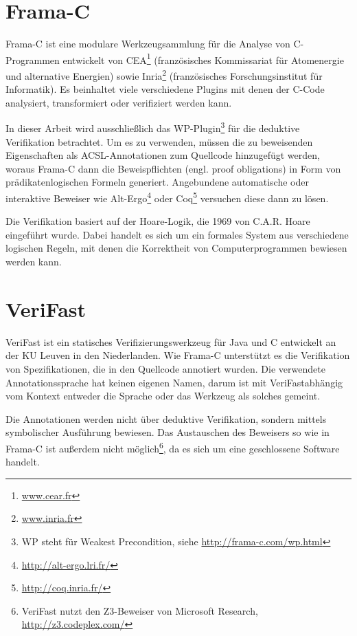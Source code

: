 \section{Frama-C}
\label{acsl-und-frama-c}

Frama-C ist eine modulare Werkzeugsammlung für die Analyse von C-Programmen entwickelt von CEA\footnote{\url{www.cear.fr}}
(französisches Kommissariat für Atomenergie und alternative Energien) sowie Inria\footnote{\url{www.inria.fr}} 
(französisches Forschungsinstitut für Informatik). Es beinhaltet viele verschiedene Plugins mit denen der C-Code
analysiert, transformiert oder verifiziert werden kann. 

In dieser Arbeit wird ausschließlich das WP-Plugin\footnote{WP steht für Weakest Precondition, siehe
\url{http://frama-c.com/wp.html}} für die deduktive Verifikation betrachtet. Um es zu verwenden, müssen die zu beweisenden 
Eigenschaften als ACSL-Annotationen zum Quellcode hinzugefügt werden, woraus Frama-C dann die 
Beweispflichten (engl. proof obligations) in Form von prädikatenlogischen Formeln generiert. Angebundene automatische oder 
interaktive Beweiser wie Alt-Ergo\footnote{\url{http://alt-ergo.lri.fr/}} oder Coq\footnote{\url{http://coq.inria.fr/}}
versuchen diese dann zu lösen.

Die Verifikation basiert auf der Hoare-Logik, die 1969 von C.A.R. Hoare eingeführt wurde\cite{hoare}. Dabei
handelt es sich um ein formales System aus verschiedene logischen Regeln, mit denen die Korrektheit von
Computerprogrammen bewiesen werden kann.


\section{VeriFast}
\label{sec:VeriFast}

VeriFast ist ein statisches Verifizierungswerkzeug für Java und C entwickelt an der KU Leuven in den Niederlanden.
Wie Frama-C unterstützt es die Verifikation von Spezifikationen, die in den Quellcode annotiert wurden. Die verwendete
Annotationssprache hat keinen eigenen Namen, darum ist mit \glqq VeriFast\grqq abhängig vom Kontext entweder die Sprache oder das
Werkzeug als solches gemeint.

Die Annotationen werden nicht über deduktive Verifikation, sondern mittels symbolischer Ausführung bewiesen. Das Austauschen
des Beweisers so wie in Frama-C ist außerdem nicht möglich\footnote{VeriFast nutzt den Z3-Beweiser von Microsoft Research,
\url{http://z3.codeplex.com/}}, da es sich um eine geschlossene Software handelt.

